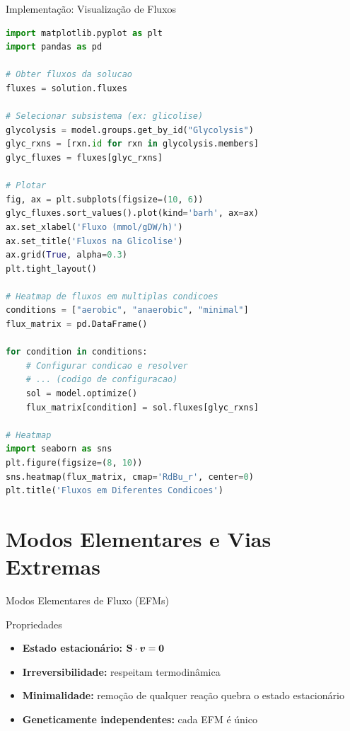 \begin{frame}[fragile]{Implementação: Visualização de Fluxos}
\begin{lstlisting}[language=Python, caption=Visualizar distribuição de fluxos]
import matplotlib.pyplot as plt
import pandas as pd

# Obter fluxos da solucao
fluxes = solution.fluxes

# Selecionar subsistema (ex: glicolise)
glycolysis = model.groups.get_by_id("Glycolysis")
glyc_rxns = [rxn.id for rxn in glycolysis.members]
glyc_fluxes = fluxes[glyc_rxns]

# Plotar
fig, ax = plt.subplots(figsize=(10, 6))
glyc_fluxes.sort_values().plot(kind='barh', ax=ax)
ax.set_xlabel('Fluxo (mmol/gDW/h)')
ax.set_title('Fluxos na Glicolise')
ax.grid(True, alpha=0.3)
plt.tight_layout()

# Heatmap de fluxos em multiplas condicoes
conditions = ["aerobic", "anaerobic", "minimal"]
flux_matrix = pd.DataFrame()

for condition in conditions:
    # Configurar condicao e resolver
    # ... (codigo de configuracao)
    sol = model.optimize()
    flux_matrix[condition] = sol.fluxes[glyc_rxns]

# Heatmap
import seaborn as sns
plt.figure(figsize=(8, 10))
sns.heatmap(flux_matrix, cmap='RdBu_r', center=0)
plt.title('Fluxos em Diferentes Condicoes')
\end{lstlisting}
\end{frame}

\section{Modos Elementares e Vias Extremas}

\begin{frame}{Modos Elementares de Fluxo (EFMs)}

\vspace{0.3cm}

\begin{block}{Propriedades}
\begin{itemize}
    \item \textbf{Estado estacionário:} $\mathbf{S} \cdot \boldsymbol{v} = \boldsymbol{0}$
    \item \textbf{Irreversibilidade:} respeitam termodinâmica
    \item \textbf{Minimalidade:} remoção de qualquer reação quebra o estado estacionário
    \item \textbf{Geneticamente independentes:} cada EFM é único
\end{itemize}
\end{block}

\end{frame}

